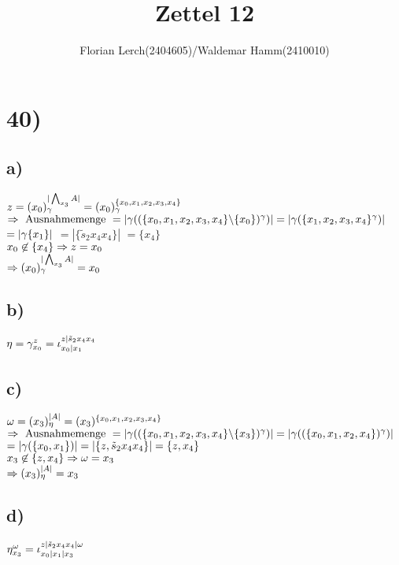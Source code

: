 \documentclass[11pt]{amsart}
\title{Zettel 12 }
\author{Florian Lerch(2404605)/Waldemar Hamm(2410010)}
\begin{document}
\maketitle

\section*{40)}
\subsection*{a)}
$z = (x_0)_{\gamma}^{|\bigwedge_{x_3}A|} = (x_0)_{\gamma}^{\{x_0,x_1,x_2,x_3,x_4\}}$ \\ %
$\Rightarrow \mbox{ Ausnahmemenge } = |\gamma((\{x_0,x_1,x_2,x_3,x_4\} \backslash \{x_0\})^{\gamma})| = |\gamma(\{x_1,x_2,x_3,x_4\}^{\gamma})|$ \\
$= |\gamma\{x_1\}|$ %
$= |\{\tilde s_2x_4x_4\}|$ %
$= \{x_4\}$ \\
$x_0 \not \in \{x_4\} \Rightarrow z = x_0$ \\
$\Rightarrow (x_0)_{\gamma}^{|\bigwedge_{x_3}A|} = x_0$
\subsection*{b)}
$\eta = \gamma^z_{x_0} = \iota_{x_0|x_1}^{z|\tilde s_2 x_4x_4}$ %
\subsection*{c)}
$\omega = (x_3)^{|A|}_{\eta} = (x_3)^{\{x_0,x_1,x_2,x_3,x_4\}}$
$\Rightarrow \mbox{ Ausnahmemenge } = |\gamma((\{x_0,x_1,x_2,x_3,x_4\} \backslash \{x_3\})^{\gamma})| = |\gamma((\{x_0,x_1,x_2,x_4\})^{\gamma})|$ \\
$= |\gamma(\{x_0,x_1\})| = |\{z, \tilde s_2 x_4 x_4\}| = \{z,x_4\}$ \\
$x_3 \not \in \{z,x_4\} \Rightarrow \omega = x_3$ \\
$\Rightarrow (x_3)^{|A|}_{\eta} = x_3$
\subsection*{d)}
$\eta_{x_3}^{\omega} = \iota_{x_0|x_1|x_3}^{z|\tilde s_2x_4 x_4|\omega}$ \\
\end{document}
